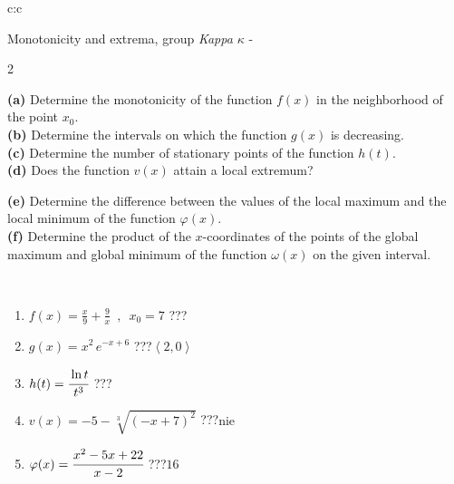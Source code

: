 \documentclass[10pt]{report}
\begin{document}
\begin{tabular}{c:c}
\begin{minipage}[c][104.5mm][t]{0.5\linewidth}
\begin{center}
\vspace{5mm}
{\huge Monotonicity and extrema, group \textit{Kappa $\kappa$} -}\\[5mm]
\begin{minipage}{0.95\linewidth}
\begin{center}
{\small \begin{multicols}{2} \raggedright
\textbf{(a)} Determine the monotonicity of the function \(f(x)\) in the neighborhood of the point \(x_0\). \\[1mm]
\textbf{(b)} Determine the intervals on which the function \(g(x)\) is decreasing. \\[1mm]
\textbf{(c)} Determine the number of stationary points of the function \(h(t)\). \\[1mm]
\textbf{(d)} Does the function \(v(x)\) attain a local extremum? \par \columnbreak
\textbf{(e)} Determine the difference between the values of the local maximum and the local minimum of the function \(\varphi(x)\). \\[1mm]
\textbf{(f)} Determine the product of the \(x\)-coordinates of the points of the global maximum and global minimum of the function \(\omega(x)\) on the given interval. \\[1mm]
\end{multicols}
}
\end{center}
\end{minipage}
\\[1mm]
\begin{minipage}{0.79\linewidth}
\begin{center}
\begin{varwidth}{\linewidth}
\setlength{\itemsep}{0pt}
\begin{enumerate}
\normalsize
\item $f(x)=\frac{x}{9}+\frac{9}{x} \enspace , \enspace x_0=7$\quad \dotfill\; ???\;\dotfill \quad {}
\item $g(x)=x^2\, e^{-x+6}$\quad \dotfill\; ???\;\dotfill \quad $\left\langle2 , 0\right\rangle$
\item $h(t)=\cfrac{\ln t}{t^3}$\quad \dotfill\; ???\;\dotfill {}
\item $v(x)=-5-\sqrt[3]{(-x+7)^2}$\quad \dotfill\; ???\;\dotfill \quad $\text{nie}$
\item $\varphi(x)=\cfrac{x^2-5x+22}{x-2}$\quad \dotfill\; ???\;\dotfill \quad $16$

\end{enumerate}
\end{varwidth}
\end{center}
\end{minipage}
\end{center}
\end{minipage}
\end{tabular}
\end{document}

